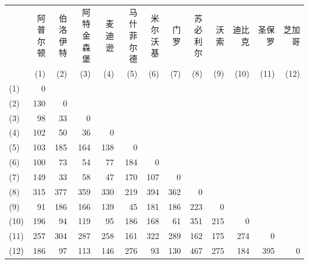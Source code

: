 
\begin{mvtable}
\label{tab:12.12}
\setlength{\tabcolsep}{2.6pt}%
%
\begin{tabular}{l*{12}{r}}
\toprule
& \makecell{阿普\\尔顿} & \makecell{伯洛\\伊特} & \makecell{阿特金\\森堡} & 麦迪逊 & \makecell{马什菲\\尔德} & \makecell{米尔\\沃基} & 门罗 & \makecell{苏必\\利尔} & 沃索 & 迪比克 & 圣保罗 & 芝加哥 \\
& (1) & (2) & (3) & (4) & (5) & (6) & (7) & (8) & (9) & (10) & (11) & (12) \\
\midrule
(1)  & 0 & & & & & & & & & & & \\
(2)  & 130 & 0 & & & & & & & & & & \\
(3)  & 98 & 33 & 0 & & & & & & & & & \\
(4)  & 102 & 50 & 36 & 0 & & & & & & & & \\
(5)  & 103 & 185 & 164 & 138 & 0 & & & & & & & \\
(6)  & 100 & 73 & 54 & 77 & 184 & 0 & & & & & & \\
(7)  & 149 & 33 & 58 & 47 & 170 & 107 & 0 & & & & & \\
(8)  & 315 & 377 & 359 & 330 & 219 & 394 & 362 & 0 & & & & \\
(9)  & 91 & 186 & 166 & 139 & 45 & 181 & 186 & 223 & 0 & & & \\
(10) & 196 & 94 & 119 & 95 & 186 & 168 & 61 & 351 & 215 & 0 & & \\
(11) & 257 & 304 & 287 & 258 & 161 & 322 & 289 & 162 & 175 & 274 & 0 & \\
(12) & 186 & 97 & 113 & 146 & 276 & 93 & 130 & 467 & 275 & 184 & 395 & 0 \\
\bottomrule
\end{tabular}
\end{mvtable}

